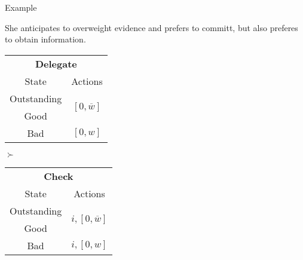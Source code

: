 \documentclass[usenames,dvipsnames,aspectratio=169,11pt, envcountsect]{beamer}
\begin{document}
\begin{frame}[noframenumbering]{Example}

	She anticipates to overweight evidence and prefers to committ, but also preferes to obtain information.

	\vfill

	\begin{table}[H]
		\centering
		\begin{minipage}{0.29\textwidth}
			\centering
			\begin{tabular}{c | c}
				\multicolumn{2}{c}{\textbf{Delegate}}                                                                          \\
				State                             & Actions                                                                    \\
				\hline
				{\color{bleudefrance}Outstanding} & \multirow{2}{*}{{\color{bleudefrance}\( \left[0, \overline{w} \right] \)}} \\
				{\color{bleudefrance}Good}        &                                                                            \\
				Bad                               & \( \left[0, w \right]\)                                                    \\
			\end{tabular}
			\vspace{0.5cm} %
		\end{minipage}\hspace{0.3cm} %
		\( \succ \) %
		\begin{minipage}{0.29\textwidth}
			\centering
			\begin{tabular}{c | c}
				\multicolumn{2}{c}{\textbf{Check}}                                                                                 \\
				State                             & Actions                                                                        \\
				\hline
				{\color{bleudefrance}Outstanding} & \multirow{2}{*}{{\color{bleudefrance}\( i, \left[ 0, \overline{w} \right] \)}} \\
				{\color{bleudefrance}Good}        &                                                                                \\
				Bad                               & \(  i, \left[0, w \right] \)                                                   \\

\end{tabular}
\end{minipage}
\end{table}
\end{frame}
\end{document}
